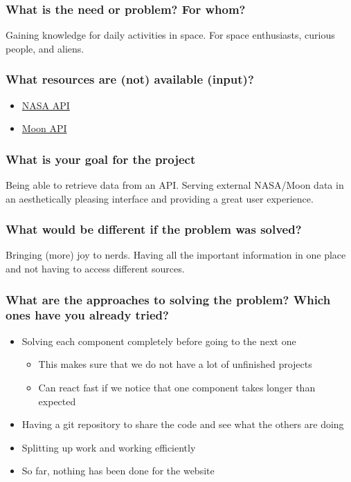\documentclass{article}
\begin{document}
\subsubsection*{What is the need or problem? For whom?}
Gaining knowledge for daily activities in space. For space enthusiasts, curious people, and aliens.
\subsubsection*{What resources are (not) available (input)?}
\begin{itemize}
    \item \href{https://api.nasa.gov/}{NASA API}
    \item \href{https://dev.qweather.com/en/docs/api/astronomy/moon-and-moon-phase/}{Moon API}
\end{itemize}
\subsubsection*{What is your goal for the project}
Being able to retrieve data from an API. Serving external NASA/Moon data in an aesthetically pleasing interface and providing a great user experience.
\subsubsection*{What would be different if the problem was solved?}
Bringing (more) joy to nerds. Having all the important information in one place and not having to access different sources.
\subsubsection*{What are the approaches to solving the problem? Which ones have you already tried?}
\begin{itemize}
    \item Solving each component completely before going to the next one
          \begin{itemize}
              \item This makes sure that we do not have a lot of unfinished projects
              \item Can react fast if we notice that one component takes longer than expected
          \end{itemize}
    \item Having a git repository to share the code and see what the others are doing
    \item Splitting up work and working efficiently
    \item So far, nothing has been done for the website
\end{itemize}
\end{document}
